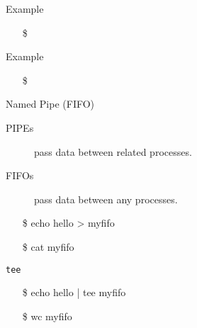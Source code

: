 \begin{frame}{Example}
  \centering%

  \begin{itemize}
  \item[\$] 
  \end{itemize}
\end{frame}

\begin{frame}{Example}
  \centering%
  \begin{itemize}
  \item[\$] 
  \end{itemize}
\end{frame}


\begin{frame}{Named Pipe (FIFO)}
  \begin{description}
  \item[PIPEs] pass data between related processes.
  \item[FIFOs] pass data between any processes.
  \end{description}
  \begin{iblock}{}
    \begin{center}
      \begin{minipage}{.45\linewidth}\ttfamily
        \begin{itemize}
        \item[\$] echo hello > myfifo
        \item[\$] cat myfifo
        \end{itemize}
      \end{minipage}\quad
      \begin{minipage}{.5\linewidth}
      \end{minipage}
    \end{center}
  \end{iblock}
  \ttfamily
  \begin{iblock}{\texttt{tee}}
    \begin{minipage}{.5\linewidth}
      \begin{itemize}
      \item[\$] echo hello | tee myfifo
      \item[\$] wc myfifo
      \end{itemize}
    \end{minipage}\quad
    \begin{minipage}{.45\linewidth}
    \end{minipage}
  \end{iblock}
\end{frame}

